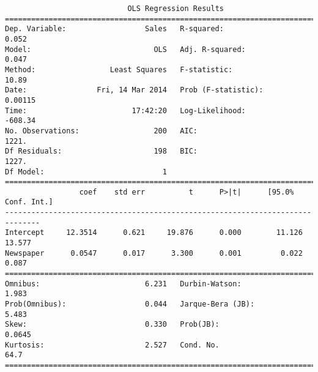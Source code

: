 \documentclass[12pt,fleqn]{article}\usepackage{../common}
\begin{document}
\begin{verbatim}
                            OLS Regression Results                            
==============================================================================
Dep. Variable:                  Sales   R-squared:                       0.052
Model:                            OLS   Adj. R-squared:                  0.047
Method:                 Least Squares   F-statistic:                     10.89
Date:                Fri, 14 Mar 2014   Prob (F-statistic):            0.00115
Time:                        17:42:20   Log-Likelihood:                -608.34
No. Observations:                 200   AIC:                             1221.
Df Residuals:                     198   BIC:                             1227.
Df Model:                           1                                         
==============================================================================
                 coef    std err          t      P>|t|      [95.0% Conf. Int.]
------------------------------------------------------------------------------
Intercept     12.3514      0.621     19.876      0.000        11.126    13.577
Newspaper      0.0547      0.017      3.300      0.001         0.022     0.087
==============================================================================
Omnibus:                        6.231   Durbin-Watson:                   1.983
Prob(Omnibus):                  0.044   Jarque-Bera (JB):                5.483
Skew:                           0.330   Prob(JB):                       0.0645
Kurtosis:                       2.527   Cond. No.                         64.7
==============================================================================
\end{verbatim}
\end{document}

